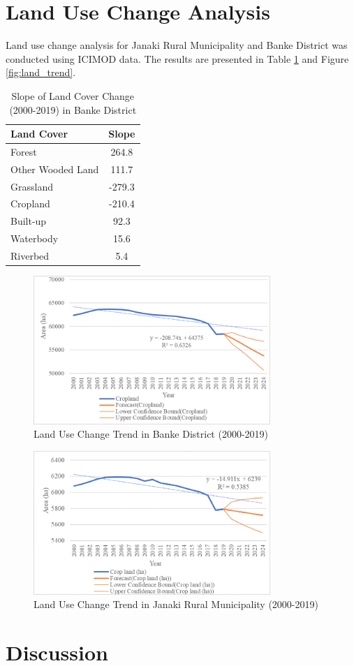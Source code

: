 \section{Land Use Change Analysis}

Land use change analysis for Janaki Rural Municipality and Banke District was conducted using ICIMOD data. The results are presented in Table \ref{tab:land_use_change} and Figure \ref{fig:land_trend}.

\begin{table}[h]
    \centering
    \caption{Slope of Land Cover Change (2000-2019) in Banke District}
    \label{tab:land_use_change}
    \begin{tabular}{lc}
        \toprule
        Land Cover & Slope \\
        \midrule
        Forest & 264.8 \\
        Other Wooded Land & 111.7 \\
        Grassland & -279.3 \\
        Cropland & -210.4 \\
        Built-up & 92.3 \\
        Waterbody & 15.6 \\
        Riverbed & 5.4 \\
        \bottomrule
    \end{tabular}
\end{table}


\begin{figure}[H]
    \centering
    \includegraphics[width=0.8\textwidth]{images/banke_land_trend.png}
    \caption{Land Use Change Trend in Banke District (2000-2019)}
    \label{fig:Banke_land_trend}
\end{figure}

\begin{figure}[H]
    \centering
    \includegraphics[width=0.8\textwidth]{images/janaki_land_trend.png}
    \caption{Land Use Change Trend in Janaki Rural Municipality (2000-2019)}
    \label{fig:Janaki_land_trend}
\end{figure}

\section{Discussion}

